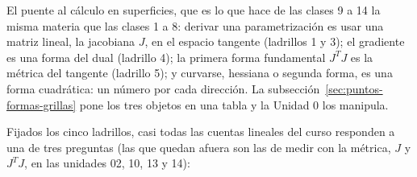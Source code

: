 El puente al cálculo en superficies, que es lo que hace de las clases 9 a 14 la misma
materia que las clases 1 a 8: derivar una parametrización es usar una matriz lineal, la
jacobiana \(J\), en el espacio tangente (ladrillos 1 y 3); el gradiente es una forma del
dual (ladrillo 4); la primera forma fundamental \(J^TJ\) es la métrica del tangente
(ladrillo 5); y curvarse, hessiana o segunda forma, es una forma cuadrática: un número por
cada dirección. La subsección~\ref{sec:puntos-formas-grillas} pone los tres objetos en
una tabla y la Unidad 0 los manipula.

\begin{resultado}[Las tres ecuaciones maestras de la materia (\(Ax=b\), \(Ax=\lambda x\), \(Ax\approx b\))]
Fijados los cinco ladrillos, casi todas las cuentas lineales del curso responden a una de tres preguntas (las que quedan afuera son las de medir con la métrica, \(J\) y \(J^TJ\), en las unidades 02, 10, 13 y 14):


\end{resultado}
